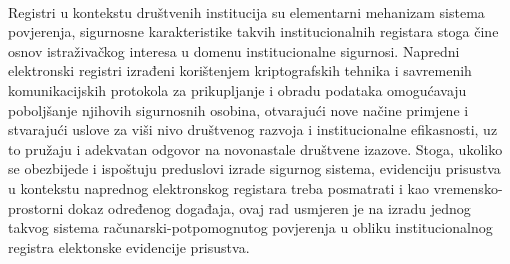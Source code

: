 \paragraph*{}
Registri u kontekstu društvenih institucija su elementarni mehanizam sistema povjerenja, sigurnosne karakteristike takvih institucionalnih registara stoga čine osnov istraživačkog interesa u domenu institucionalne sigurnosi. Napredni elektronski registri izrađeni korištenjem kriptografskih tehnika i savremenih komunikacijskih protokola za prikupljanje i obradu podataka omogućavaju poboljšanje njihovih sigurnosnih osobina, otvarajući nove načine primjene i stvarajući uslove za viši nivo društvenog razvoja i institucionalne efikasnosti, uz to pružaju i adekvatan odgovor na novonastale društvene izazove. Stoga, ukoliko se obezbijede i ispoštuju preduslovi izrade sigurnog sistema\cite{iso2013iso}, evidenciju prisustva u kontekstu naprednog elektronskog registara treba posmatrati i kao vremensko-prostorni dokaz određenog događaja, ovaj rad usmjeren je na izradu jednog takvog sistema računarski-potpomognutog povjerenja u obliku institucionalnog registra elektonske evidencije prisustva.